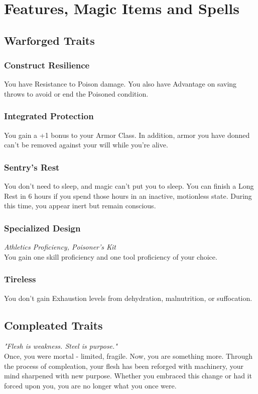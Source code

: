 \documentclass[letterpaper,openany,oneside,twocolumn]{book}
\begin{document}
\onecolumn


\rendercharactersheet

\renderbackgroundsheet

\renderspellsheet


\restoregeometry
\twocolumn

\chapter*{Features, Magic Items and Spells}

\section*{Warforged Traits}
\subsection*{Construct Resilience}
You have Resistance to Poison damage. You also have Advantage on saving throws to avoid or end the Poisoned condition.
\subsection*{Integrated Protection}
You gain a +1 bonus to your Armor Class. In addition, armor you have donned can't be removed against your will while you're alive.
\subsection*{Sentry's Rest}
You don't need to sleep, and magic can't put you to sleep. You can finish a Long Rest in 6 hours if you spend those hours in an inactive, motionless state. During this time, you appear inert but remain conscious.
\subsection*{Specialized Design}
\textit{Athletics Proficiency, Poisoner's Kit}\\
You gain one skill proficiency and one tool proficiency of your choice.
\subsection*{Tireless}
You don't gain Exhaustion levels from dehydration, malnutrition, or suffocation.

\section*{Compleated Traits}
\textit{"Flesh is weakness. Steel is purpose."}\\
Once, you were mortal - limited, fragile. Now, you are something more. Through the process of compleation, your flesh has been reforged with machinery, your mind sharpened with new purpose. Whether you embraced this change or had it forced upon you, you are no longer what you once were.
\end{document}
